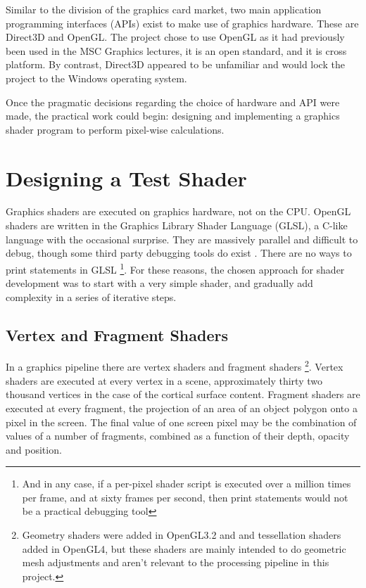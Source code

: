 \documentclass[MSc,paper=a4,pagesize=auto]{icldt}
\begin{document}
Similar to the division of the graphics card market, two main application programming interfaces (APIs) exist to make use of graphics hardware. These are Direct3D and OpenGL. The project chose to use OpenGL as it had previously been used in the MSC Graphics lectures, it is an open standard, and it is cross platform. By contrast, Direct3D appeared to be unfamiliar and would lock the project to the Windows operating system.

Once the pragmatic decisions regarding the choice of hardware and API were made, the practical work could begin: designing and implementing a graphics shader program to perform pixel-wise calculations.

\section{Designing a Test Shader}
Graphics shaders are executed on graphics hardware, not on the CPU. OpenGL shaders are written in the Graphics Library Shader Language (GLSL), a C-like language with the occasional surprise. They are massively parallel and difficult to debug, though some third party debugging tools do exist \cite{glslDevil}. There are no ways to print statements in GLSL \footnote{And in any case, if a per-pixel shader script is executed over a million times per frame, and at sixty frames per second, then print statements would not be a practical debugging tool}. For these reasons, the chosen approach for shader development was to start with a very simple shader, and gradually add complexity in a series of iterative steps. 

\subsection{Vertex and Fragment Shaders}
In a graphics pipeline there are vertex shaders and fragment shaders \footnote{Geometry shaders were added in OpenGL3.2 and and tessellation shaders added in OpenGL4, but these shaders are mainly intended to do geometric mesh adjustments and aren't relevant to the processing pipeline in this project.}. Vertex shaders are executed at every vertex in a scene, approximately thirty two thousand vertices in the case of the cortical surface content. Fragment shaders are executed at every fragment, the projection of an area of an object polygon onto a pixel in the screen. The final value of one screen pixel may be the combination of values of a number of fragments, combined as a function of their depth, opacity and position.
\end{document}
